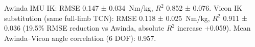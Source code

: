 Awinda IMU IK: RMSE 0.147 ± 0.034~Nm/kg, $R^2$ 0.852 ± 0.076.
Vicon IK substitution (same full-limb TCN): RMSE 0.118 ± 0.025~Nm/kg, $R^2$ 0.911 ± 0.036
(19.5\% RMSE reduction vs Awinda, absolute $R^2$ increase +0.059).
Mean Awinda–Vicon angle correlation (6 DOF): 0.957.


